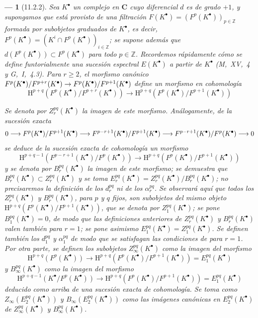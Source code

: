 \documentclass[10pt,oneside,openany]{book}
\theoremstyle{egaenv}\newtheorem*{env}{---}
\theoremstyle{egastatement}
\theoremstyle{egadescription}
\newcommand{\oldpage}[2][]{\marginnote{\normalfont\scriptsize\textbf{#1}\,|\,#2}\ignorespaces}
\renewcommand{\geq}{\geqslant}
\renewcommand{\to}{\mathchoice{\longrightarrow}{\rightarrow}{\rightarrow}{\rightarrow}}
\begin{document}
\begin{env}[11.2.2]
\label{0.11.2.2}
\label{0.11.2.2-fr}
Sea $K^\bullet$ un complejo en $\boldsymbol{C}$ cuyo diferencial $d$ es de grado $+1$, y supongamos que está provisto de una \emph{filtración $F(K^\bullet)=(F^p(K^\bullet))_{p\in\mathbb Z}$} formada por subobjetos \emph{graduados}
\oldpage[0\textsubscript{III}]{28}
de $K^\bullet$, es decir, $F^p(K^\bullet)=(K^i\cap F^p(K^\bullet))_{i\in\mathbb Z}$; se supone además que $d(F^p(K^\bullet))\subset F^p(K^\bullet)$ para todo $p\in\mathbb Z$.
Recordemos rápidamente cómo se define \emph{funtorialmente} una sucesión espectral $E(K^\bullet)$ a partir de $K^\bullet$ (M,~XV,~4 y G,~I,~4.3).
Para $r\geq2$, el morfismo canónico $F^p(K^\bullet)/F^{p+r}(K^\bullet)\to
F^p(K^\bullet)/F^{p+1}(K^\bullet)$ define un morfismo en cohomología
\[
  \mathrm H^{p+q}(F^p(K^\bullet)/F^{p+r}(K^\bullet))
  \longrightarrow
  \mathrm H^{p+q}(F^p(K^\bullet)/F^{p+1}(K^\bullet))
\]

Se denota por $Z_r^{pq}(K^\bullet)$ la imagen de este morfismo.
Análogamente, de la sucesión exacta
\[
  0\to F^p(K^\bullet)/F^{p+1}(K^\bullet)
  \to F^{p-r+1}(K^\bullet)/F^{p+1}(K^\bullet)
  \to F^{p-r+1}(K^\bullet)/F^p(K^\bullet)\to0
\]
se deduce de la sucesión exacta de cohomología un morfismo
\[
  \mathrm H^{p+q-1}(F^{p-r+1}(K^\bullet)/F^p(K^\bullet))
  \longrightarrow
  \mathrm H^{p+q}(F^p(K^\bullet)/F^{p+1}(K^\bullet))
\]
y se denota por $B_r^{pq}(K^\bullet)$ la imagen de este morfismo; se demuestra que $B_r^{pq}(K^\bullet)\subset Z_r^{pq}(K^\bullet)$ y se toma $E_r^{pq}(K^\bullet)=Z_r^{pq}(K^\bullet)/B_r^{pq}(K^\bullet)$; no precisaremos la definición de los $d_r^{pq}$ ni de los $\alpha_r^{pq}$. Se observará aquí que todos los $Z_r^{pq}(K^\bullet)$ y $B_r^{pq}(K^\bullet)$, para $p$ y $q$ fijos, son subobjetos del mismo objeto $\mathrm H^{p+q}(F^p(K^\bullet)/F^{p+1}(K^\bullet))$, que se denota por $Z_1^{pq}(K^\bullet)$; se pone $B_1^{pq}(K^\bullet)=0$, de modo que las definiciones anteriores de $Z_r^{pq}(K^\bullet)$ y $B_r^{pq}(K^\bullet)$ valen también para $r=1$; se pone asimismo $E_1^{pq}(K^\bullet)=Z_1^{pq}(K^\bullet)$. Se definen también los $d_1^{pq}$ y $\alpha_1^{pq}$ de modo que se satisfagan las condiciones de  para $r=1$.
Por otra parte, se definen los subobjetos $Z_\infty^{pq}(K^\bullet)$ como la imagen del morfismo
\[
  \mathrm H^{p+q}(F^p(K^\bullet))\longrightarrow
  \mathrm H^{p+q}(F^p(K^\bullet)/F^{p+1}(K^\bullet))
  =E_1^{pq}(K^\bullet)
\]
y $B_\infty^{pq}(K^\bullet)$ como la imagen del morfismo
\[
  \mathrm H^{p+q-1}(K^\bullet/F^p(K^\bullet))\longrightarrow
  \mathrm H^{p+q}(F^p(K^\bullet)/F^{p+1}(K^\bullet))
  =E_1^{pq}(K^\bullet)
\] deducido como arriba de una sucesión exacta de cohomología. Se toma como $Z_\infty(E_2^{pq}(K^\bullet))$ y $B_\infty(E_2^{pq}(K^\bullet))$ como las imágenes canónicas en $E_2^{pq}(K^\bullet)$ de $Z_\infty^{pq}(K^\bullet)$ y $B_\infty^{pq}(K^\bullet)$.


\end{env}
\end{document}
